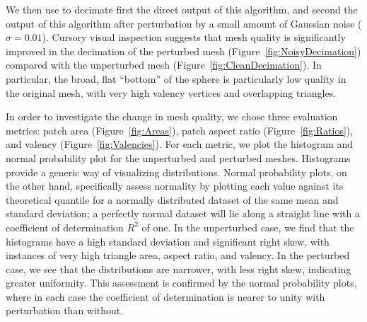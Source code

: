 \documentclass{InsightArticle}
\begin{document}
We then use  to decimate first the direct output of this algorithm, and second the output of this algorithm after perturbation by a small amount of Gaussian noise ($\sigma = 0.01$).  Cursory visual inspection suggests that mesh quality is significantly improved in the decimation of the perturbed mesh (Figure~\ref{fig:NoisyDecimation}) compared with the unperturbed mesh (Figure~\ref{fig:CleanDecimation}).  In particular, the broad, flat ``bottom'' of the sphere is particularly low quality in the original mesh, with very high valency vertices and overlapping triangles.

In order to investigate the change in mesh quality, we chose three evaluation metrics: patch area (Figure~\ref{fig:Areas}), patch aspect ratio (Figure~\ref{fig:Ratios}), and valency (Figure~\ref{fig:Valencies}).  For each metric, we plot the histogram and normal probability plot for the unperturbed and perturbed meshes.  Histograms provide a generic way of visualizing distributions.  Normal probability plots, on the other hand, specifically assess normality by plotting each value against its theoretical quantile for a normally distributed dataset of the same mean and standard deviation; a perfectly normal dataset will lie along a straight line with a coefficient of determination $R^2$ of one.  In the unperturbed case, we find that the histograms have a high standard deviation and significant right skew, with instances of very high triangle area, aspect ratio, and valency.  In the perturbed case, we see that the distributions are narrower, with less right skew, indicating greater uniformity.  This assessment is confirmed by the normal probability plots, where in each case the coefficient of determination is nearer to unity with perturbation than without.
\end{document}

